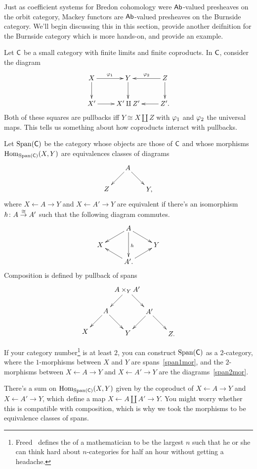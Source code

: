 Just as coefficient systems for Bredon cohomology were $\mathsf{Ab}$-valued presheaves on the orbit category, Mackey
functors are $\mathsf{Ab}$-valued presheaves on the Burnside category. We'll begin discussing this in this section, provide
another deifnition for the Burnside category which is more hands-on, and provide an example.

Let $\mathsf C$ be a small category with finite limits and finite coproducts. In $\mathsf C$, consider the diagram
\[\xymatrix{
	X\ar[r]^{\vp_1}\ar[d] & Y\ar[d] & Z\ar[d]\ar[l]_{\vp_2}\\
	X'\ar[r] & X'\amalg Z' & Z'.\ar[l]
}\]
Both of these squares are pullbacks iff $Y\cong X\amalg Z$ with $\varphi_1$ and $\varphi_2$ the universal maps. This tells
us something about how coproducts interact with pullbacks.
\begin{defn}
Let $\operatorname{Span}(\mathsf C)$ be the category whose objects are those of $\mathsf C$ and whose morphisms $\operatorname{Hom}_{\operatorname{Span}(\mathsf C)}(X,Y)$ are
equivalences classes of diagrams
\begin{equation}
\label{span1mor}
\gathxy[@dr]{
	A\ar[r]\ar[d] & Y,\\
	Z
}
\end{equation}
where $X\gets A\to Y$ and $X\gets A'\to Y$ are equivalent if there's an isomorphism $h\colon A\stackrel\cong\to A'$ such that
the following diagram commutes.
\begin{equation}
\label{span2mor}
\gathxy[@R=0.4cm]{
	& A\ar[dr]\ar[dl]\ar[dd]^h\\
	X && Y\\
	& A'.\ar[ul]\ar[ur]
}
\end{equation}
Composition is defined by pullback of spans
\[\xymatrix@dr{
	A\times_Y A'\ar[r]\ar[d] & A'\ar[r]\ar[d] & Z.\\
	A\ar[r]\ar[d] & Y\\
	X
}\]
\end{defn}
\begin{rem}
If your category number\footnote{Freed~\cite{CSRemarks} defines the  of a mathematician to be
the largest $n$ such that he or she can think hard about $n$-categories for half an hour without getting a
headache.} is at least $2$, you can construct $\operatorname{Span}(\mathsf C)$ as a $2$-category, where the $1$-morphisms between $X$
and $Y$ are spans~\eqref{span1mor}, and the $2$-morphisms between $X\gets A\to Y$ and $X\gets A'\to Y$ are the
diagrams~\eqref{span2mor}.
\end{rem}
There's a sum on $\operatorname{Hom}_{\operatorname{Span}(\mathsf C)}(X,Y)$ given by the coproduct of $X\gets A\to Y$ and $X\gets A'\to Y$, which
define a map $X\gets A\amalg A'\to Y$. You might worry whether this is compatible with composition, which is why
we took the morphisms to be equivalence classes of spans.

